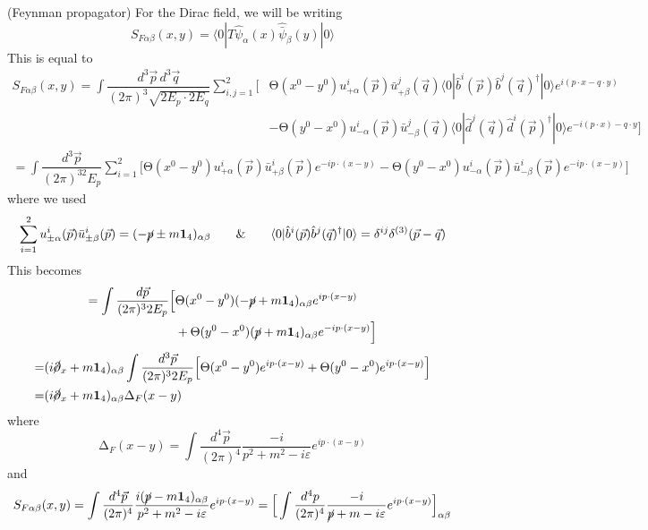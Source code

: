 \begin{defi}
(Feynman propagator) For the Dirac field, we will be writing 
\[S_{F\alpha \beta }(x,y)=\langle 0|T\hat{\psi }_{\alpha }(x)\hat{\bar{\psi }}_{\beta }(y)|0\rangle \]
This is equal to
\[\begin{align*}
S_{F\alpha \beta }(x,y)=\int \dfrac{d^3\vec{p}\,d^3\vec{q}}{(2\pi )^3\sqrt{2E_{p}\cdot 2E_{q}}}\sum ^{2}_{i,j=1}\Big[&\mathrm{\Theta}(x^{0}-y^{0})u^{i}_{+\alpha }(\vec{p})\bar{u}^{j}_{+\beta }(\vec{q})\langle 0|\hat{b}^{i}(\vec{p})\hat{b}^{j}(\vec{q})^{\dagger}|0\rangle e^{i(p\cdot x-q\cdot y)}\\
&-\mathrm{\Theta}(y^{0}-x^{0})u^{i}_{-\alpha }(\vec{p})\bar{u}^{j}_{-\beta }(\vec{q})\langle 0|\hat{d}^{j}(\vec{q})\hat{d}^{i}(\vec{p})^{\dagger}|0\rangle e^{-i(p\cdot x)-q\cdot y}\Big]
\end{align*}\]
\[\begin{align*}
=\int \dfrac{d^3\vec{p}}{(2\pi )^32E_{p}}\sum ^{2}_{i=1}\Big[\mathrm{\Theta}(x^{0}-y^{0})u^{i}_{+\alpha }(\vec{p})\bar{u}^{i}_{+\beta }(\vec{p})e^{-ip\cdot (x-y)}-\mathrm{\Theta}(y^{0}-x^{0})u_{-\alpha }^{i}(\vec{p})\bar{u}_{-\beta }^{i}(\vec{p})e^{-ip\cdot (x-y)}\Big]
\end{align*}\]
where we used
\[\begin{align*}
\sum ^{2}_{i=1}u_{\pm\alpha }^{i}(\vec{p})\bar{u}^{i}_{\pm\beta }(\vec{p})=(-\cancel{p}\pm m{\bf 1}_{4})_{\alpha \beta }\qquad\&\qquad \langle 0|\hat{b}^{i}(\vec{p})\hat{b}^{j}(\vec{q})^{\dagger}|0\rangle =\delta ^{ij}\delta ^{(3)}(\vec{p}-\vec{q})
\end{align*}\]
This becomes
\[\begin{align*}
=\int \dfrac{d\vec{p}}{(2\pi )^32E_{p}}\Big[&\mathrm{\Theta}(x^{0}-y^{0})(-\cancel{p}+m{\bf 1}_{4})_{\alpha \beta }e^{ip\cdot (x-y)}\\&+\mathrm{\Theta}(y^{0}-x^{0})(\cancel{p}+m{\bf 1}_{4})_{\alpha \beta }e^{-ip\cdot (x-y)}\Big]
\end{align*}\]
\[\begin{align*}
=&(i\cancel{\partial }_{x}+m{\bf 1}_{4})_{\alpha \beta }\int \dfrac{d^3\vec{p}}{(2\pi )^32E_{p}}\Big[\mathrm{\Theta}(x^{0}-y^{0})e^{ip\cdot (x-y)}+\mathrm{\Theta}(y^{0}-x^{0})e^{ip\cdot (x-y)}\Big]\\
=&(i\cancel{\partial }_{x}+m{\bf 1}_{4})_{\alpha \beta }\mathrm{\Delta }_{F}(x-y)
\end{align*}\]
where
\[\mathrm{\Delta }_{F}(x-y)=\int \dfrac{d^{4}\vec{p}}{(2\pi )^{4}}\dfrac{-i}{p^2+m^2-i\varepsilon }e^{ip\cdot (x-y)}\]
and
\[S_{F\alpha \beta }(x,y)=\int \dfrac{d^{4}\vec{p}}{(2\pi )^{4}}\dfrac{i(\cancel{p}-m{\bf 1}_{4})_{\alpha \beta }}{p^2+m^2-i\varepsilon }e^{ip\cdot (x-y)}=\Big[\int \dfrac{d^{4}p}{(2\pi )^{4}}\dfrac{-i}{\cancel{p}+m-i\varepsilon }e^{ip\cdot (x-y)}\Big]_{\alpha \beta }\]

\end{defi}

